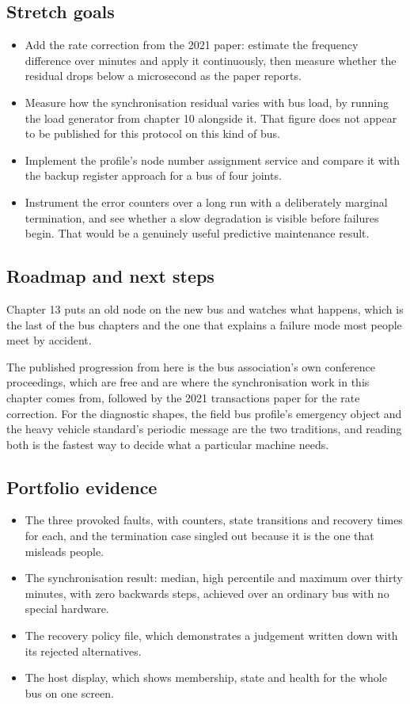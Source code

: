 \subsection*{Stretch goals}

\begin{itemize}
\item Add the rate correction from the 2021 paper: estimate the frequency
difference over minutes and apply it continuously, then measure whether the
residual drops below a microsecond as the paper reports.
\item Measure how the synchronisation residual varies with bus load, by running
the load generator from chapter 10 alongside it. That figure does not appear to
be published for this protocol on this kind of bus.
\item Implement the profile's node number assignment service and compare it with
the backup register approach for a bus of four joints.
\item Instrument the error counters over a long run with a deliberately marginal
termination, and see whether a slow degradation is visible before failures
begin. That would be a genuinely useful predictive maintenance result.
\end{itemize}

\subsection*{Roadmap and next steps}

Chapter 13 puts an old node on the new bus and watches what happens, which is
the last of the bus chapters and the one that explains a failure mode most
people meet by accident.

The published progression from here is the bus association's own conference
proceedings, which are free and are where the synchronisation work in this
chapter comes from, followed by the 2021 transactions paper for the rate
correction. For the diagnostic shapes, the field bus profile's emergency object
and the heavy vehicle standard's periodic message are the two traditions, and
reading both is the fastest way to decide what a particular machine needs.

\subsection*{Portfolio evidence}

\begin{itemize}
\item The three provoked faults, with counters, state transitions and recovery
times for each, and the termination case singled out because it is the one that
misleads people.
\item The synchronisation result: median, high percentile and maximum over
thirty minutes, with zero backwards steps, achieved over an ordinary bus with no
special hardware.
\item The recovery policy file, which demonstrates a judgement written down with
its rejected alternatives.
\item The host display, which shows membership, state and health for the whole
bus on one screen.
\end{itemize}

